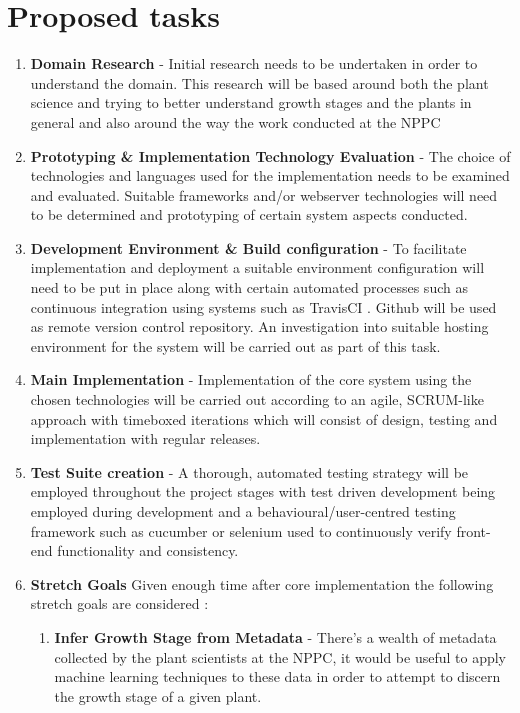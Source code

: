 \documentclass[11pt,fleqn,twoside]{article}
\begin{document}
\section{Proposed tasks}
\begin{enumerate} 
\item \textbf{Domain Research} - Initial research needs to be undertaken in order to understand the domain. This research will be based around both the plant science and trying to better understand growth stages and the plants in general and also around the way the work conducted at the NPPC 

\item \textbf{Prototyping \& Implementation Technology Evaluation } - The choice of technologies and languages used for the implementation needs to be examined and evaluated. Suitable frameworks and/or webserver technologies will need to be determined and prototyping of certain system aspects conducted.
\item \textbf{Development Environment \& Build configuration} - To facilitate implementation and deployment a suitable environment configuration will need to be put in place along with certain automated processes such as continuous integration using systems such as TravisCI \cite{_travis}. Github\cite{_git} will be used as remote version control repository. An investigation into suitable hosting environment for the system will be carried out as part of this task.
\item \textbf{Main Implementation} - Implementation of the core system using the chosen technologies will be carried out according to an agile, SCRUM-like approach with timeboxed iterations which will consist of design, testing and implementation with regular releases. 
\item \textbf{Test Suite creation} - A thorough, automated testing strategy will be employed throughout the project stages with test driven development being employed during development and a behavioural/user-centred testing framework such as cucumber or selenium used to continuously verify front-end functionality and consistency. 
\item \textbf{Stretch Goals} Given enough time after core implementation the following stretch goals are considered :
\begin{enumerate}
\item \textbf{Infer Growth Stage from Metadata} - There's a wealth of metadata collected by the plant scientists at the NPPC, it would be useful to apply machine learning techniques to these data in order to attempt to discern the growth stage of a given plant.

\end{enumerate}
\end{enumerate}
\end{document}
